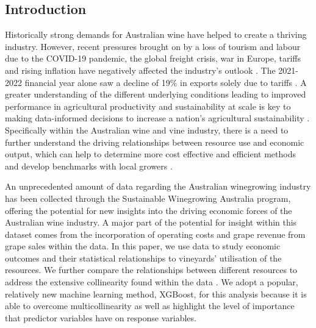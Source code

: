 \documentclass[review,12pt,authoryear]{elsarticle}
\begin{document}
\begin{linenumbers}
%







\section{Introduction}

Historically strong demands for Australian wine have helped to create a thriving industry. However, recent pressures brought on by a loss of tourism and labour due to the COVID-19 pandemic, the global freight crisis, war in Europe, tariffs and rising inflation have negatively affected the industry's outlook \citep{wineaustraliaNationalVintageReport2021,wineaustraliaAustralianWineProduction2021}. The 2021-2022 financial year alone saw a decline of 19\% in exports solely due to tariffs \citep{wineaustraliaNationalVintageReport2022}. A greater understanding of the different underlying conditions leading to improved performance in agricultural productivity and sustainability at scale is key to making data-informed decisions to increase a nation's agricultural sustainability \citep{oecdInnovationProductivitySustainability2019}. Specifically within the Australian wine and vine industry, there is a need to further understand the driving relationships between resource use and economic output, which can help to determine more cost effective and efficient methods and develop benchmarks with local growers \citep{lukemanciniUnderstandingAustralianWine2020}.
\par
An unprecedented amount of data regarding the Australian winegrowing industry has been collected through the Sustainable Winegrowing Australia program, offering the potential for new insights into the driving economic forces of the Australian wine industry. A major part of the potential for insight within this dataset comes from the incorporation of operating costs and grape revenue from grape sales within the data. In this paper, we use data to study economic outcomes and their statistical relationships to vineyards' utilisation of the resources. We further compare the relationships between different resources to address the extensive collinearity found within the data \citep{chenXGBoostScalableTree2016}. We adopt  a popular, relatively new machine learning method, XGBoost, for this analysis because it is able to overcome multicollinearity as well as highlight the level of importance that predictor variables have on response variables.


\end{linenumbers}
\end{document}

